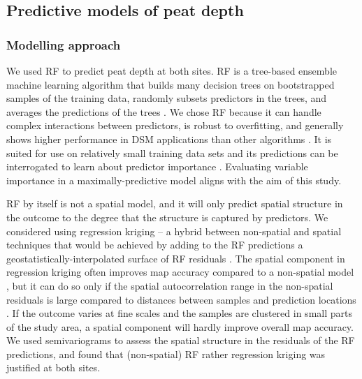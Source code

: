 \documentclass[soil, manuscript]{copernicus}
\begin{document}
\subsection{Predictive models of peat depth}

\subsubsection{Modelling approach}

We used RF to predict peat depth at both sites.
RF is a tree-based ensemble machine learning algorithm that builds many decision trees on bootstrapped samples of the training data, randomly subsets predictors in the trees, and averages the predictions of the trees \citep{breimanRandomForests2001}.
We chose RF because it can handle complex interactions between predictors, is robust to overfitting, and generally shows higher performance in DSM applications than other algorithms \citep{beguinPredictingSoilProperties2017, nussbaumEvaluationDigitalSoil2018, lamichhaneDigitalSoilMapping2019}.
It is suited for use on relatively small training data sets and its predictions can be interrogated to learn about predictor importance \citep{khaledianSelectingAppropriateMachine2020}.
Evaluating variable importance in a maximally-predictive model aligns with the aim of this study.

RF by itself is not a spatial model, and it will only predict spatial structure in the outcome to the degree that the structure is captured by predictors.
We considered using regression kriging -- a hybrid between non-spatial and spatial techniques that would be achieved by adding to the RF predictions a geostatistically-interpolated surface of RF residuals \citep{henglGenericFrameworkSpatial2004}.
The spatial component in regression kriging often improves map accuracy compared to a non-spatial model \citep{beguinPredictingSoilProperties2017, lamichhaneDigitalSoilMapping2019, mollaMachineLearningGeostatistical2023}, but it can do so only if the spatial autocorrelation range in the non-spatial residuals is large compared to distances between samples and prediction locations \citep{henglGenericFrameworkSpatial2004, szaboMappingSoilHydraulic2019, takoutsingComparingPredictionPerformance2022}.
If the outcome varies at fine scales and the samples are clustered in small parts of the study area, a spatial component will hardly improve overall map accuracy.
We used semivariograms to assess the spatial structure in the residuals of the RF predictions, and found that (non-spatial) RF rather regression kriging was justified at both sites.
\end{document}

